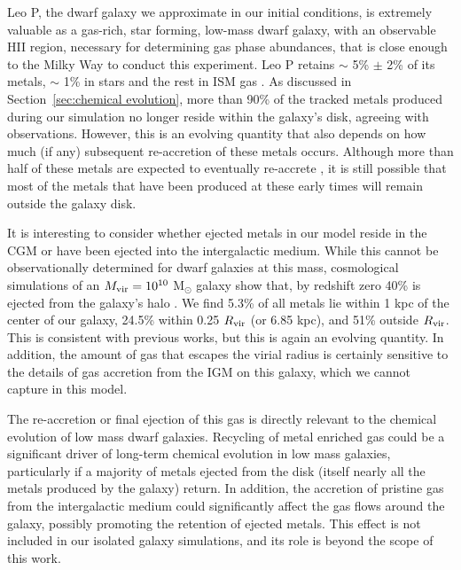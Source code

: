 \documentclass[fleqn,usenatbib,useAMS]{mnras}
\begin{document}
Leo P, the dwarf galaxy we approximate in our initial conditions, is extremely valuable as a gas-rich,
star forming, low-mass dwarf galaxy, with an observable HII region, necessary for determining gas phase abundances, that is close enough to the Milky Way to conduct this experiment. Leo P retains $\sim$ 5\% $\pm$ 2\% of its metals, $\sim$ 1\% in stars and the rest in ISM gas \citep{McQuinn2015}. As discussed in Section~\ref{sec:chemical evolution}, more than 90\% of the tracked metals produced during our simulation no longer reside within the galaxy's disk, agreeing with observations. However, this is an evolving quantity that also depends on how much (if any) subsequent re-accretion of these metals occurs. Although more than half of these metals are expected to eventually re-accrete \citep{Angles-Alcazar2017}, it is still possible that most of the metals that have been produced at these early times will remain outside the galaxy disk.

It is interesting to consider whether ejected metals in our model reside in the CGM or have been ejected into the intergalactic medium. While this cannot be observationally determined for dwarf galaxies at this mass, cosmological simulations of an $M_{\rm vir} = 10^{10}$ M$_{\odot}$ galaxy show that, by redshift zero 40\% is ejected from the galaxy's halo \citep{Angles-Alcazar2017}. We find 5.3\% of all metals lie within 1 kpc of the center of our galaxy, 24.5\% within 0.25 $R_{\rm vir}$ (or 6.85 kpc), and 51\% outside $R_{\rm vir}$. This is consistent with previous works, but this is again an evolving quantity. In addition, the amount of gas that escapes the virial radius is certainly sensitive to the details of gas accretion from the IGM on this galaxy, which we cannot capture in this model.

The re-accretion or final ejection of this gas is directly relevant to the chemical evolution of low mass dwarf galaxies. Recycling of metal enriched gas could be a significant driver of long-term chemical evolution in low mass galaxies, particularly if a majority of metals ejected from the disk (itself nearly all the metals produced by the galaxy) return. In addition, the accretion of pristine gas from the intergalactic medium could significantly affect the gas flows around the galaxy, possibly promoting the retention of ejected metals. This effect is not included in our isolated galaxy simulations, and its role is beyond the scope of this work.
\end{document}
